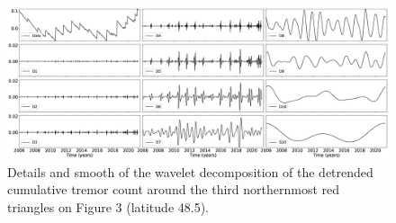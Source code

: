 \documentclass{article}
\begin{document}
\begin{figure}
\noindent\includegraphics[width=\textwidth, trim={0cm 0cm 0cm 0cm},clip]{figures/tremor_13.eps}
\caption{Details and smooth of the wavelet decomposition of the detrended cumulative tremor count around the third northernmost red triangles on Figure 3 (latitude 48.5).}
\label{pngfiguresample}
\end{figure}
\end{document}
